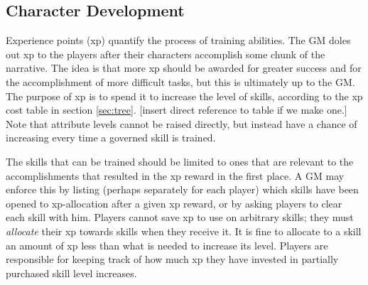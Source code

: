\documentclass[12pt]{article}
\newcommand{\notes}[1]{{\color{Tan} #1}}
\begin{document}





\subsection{Character Development}\label{sec:dev}

Experience points (xp) quantify the process of training abilities.
The GM doles out xp to the players after their characters accomplish some chunk of the narrative.
The idea is that more xp should be awarded for greater success and for the accomplishment of more difficult tasks,
but this is ultimately up to the GM.
The purpose of xp is to spend it to increase the level of skills, according to the xp cost table in section \ref{sec:tree}.
\notes{[insert direct reference to table if we make one.]}
Note that attribute levels cannot be raised directly, but instead have a chance of increasing every time a governed skill is trained.

The skills that can be trained should be limited to ones that are relevant to the accomplishments that resulted in the xp reward in the first place.
A GM may enforce this by listing 
(perhaps separately for each player)
which skills have been opened
to xp-allocation after a given xp reward,
or by asking players to clear each skill with him.
Players cannot save xp to use on arbitrary skills; they must \emph{allocate} their xp towards skills when they receive it.
It is fine to allocate to a skill an amount of xp less than what is needed to increase its level.
Players are responsible for keeping track of how much xp they have invested in partially purchased skill level increases.


\end{document}
